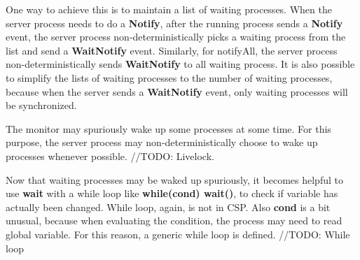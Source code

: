One way to achieve this is to maintain a list of waiting processes. When the server process needs to do a \textbf{Notify}, after the running process sends a \textbf{Notify} event, the server process non-deterministically picks a waiting process from the list and send a \textbf{WaitNotify} event. Similarly, for notifyAll, the server process non-deterministically sends \textbf{WaitNotify} to all waiting process. It is also possible to simplify the lists of waiting processes to the number of waiting processes, because when the server sends a \textbf{WaitNotify} event, only waiting processes will be synchronized. 

The monitor may spuriously wake up some processes at some time. For this purpose, the server process may non-deterministically choose to wake up processes whenever possible. //TODO: Livelock.

Now that waiting processes may be waked up spuriously, it becomes helpful to use \textbf{wait} with a while loop like \textbf{while(cond) wait()}, to check if variable has actually been changed. While loop, again, is not in CSP. Also \textbf{cond} is a bit unusual, because when evaluating the condition, the process may need to read global variable. For this reason, a generic while loop is defined. //TODO: While loop
